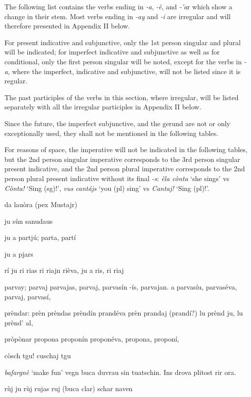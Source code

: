 The following list contains the verbs ending in \textit{-a}, \textit{-è}, and \textit{-'a}r which show a change in their stem. Most verbs ending in \textit{-ay} and \textit{-i} are irregular and will therefore presented in Appendix II below.

For present indicative and subjunctive, only the 1st person singular and plural will be indicated; for imperfect indicative and subjunctive as well as for conditional, only the first person singular will be noted, except for the verbs in \textit{-a}, where the imperfect, indicative and subjunctive, will not be listed since it is regular.

The past participles of the verbs in this section, where irregular, will be listed separately with all the irregular participles in Appendix II below.

Since the future, the imperfect subjunctive, and the gerund are not or only exceptionally used, they shall not be mentioned in the following tables.

For reasons of space, the imperative will not be indicated in the following tables, but the 2nd person singular imperative corresponds to the 3rd person singular present indicative, and the 2nd person plural imperative corresponds to the 2nd person plural present indicative without its final \textit{-s}: \textit{èla cònta} `she sings' vs \textit{Cònta!} `Sing (sg)!', \textit{vus cantájs} `you (pl) sing' vs \textit{Cantaj!} `Sing (pl)!'.

da lauòra (pex Mustajr)
 
 ju sùn sanudaus
 
 ju a partjú; parta, partí 
 
 ju a pjars
 
 rí ju ri rias ri riajn rièva, ju a ris, ri riaj
 
 parvay; parvaj parvajas, parvaj, parvasín -ís, parvajan. a parvasíu, parvaséva, parvaj, parvasí, 
 
 prèndar: prèn prèndas prèndín prandéva prèn prandaj (prandí?) lu prènd ju, lu prènd' al, 
 
 pròpònar propona proponín proponéva, propona, proponí, 
 
 còsch tgu! cuschaj tgu
 
 \textit{bafargnè}  ‘make fun’ vegn buca duvrau sin tuatschin. Ins drova plitost rir ora.
 
 rùj ju rùj rujas ruj (buca clar) schar naven
 
 
 
